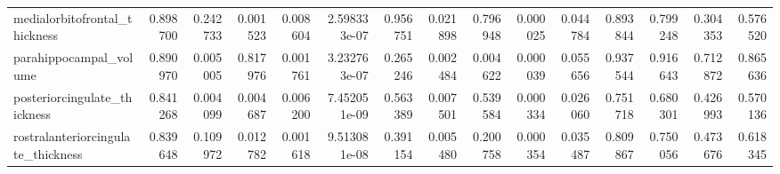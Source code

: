 \begin{tabular}{lrrrrrrrrrrrrrr}
medialorbitofrontal\_thickness      &  0.898700 &    0.242733 &     0.001523 &  0.008604 &  2.598333e-07 &      0.956751 &      0.021898 &  0.796948 &  0.000025 &  0.044784 &  0.893844 &  0.799248 &  0.304353 &  0.576520 \\
parahippocampal\_volume             &  0.890970 &    0.005005 &     0.817976 &  0.001761 &  3.232763e-07 &      0.265246 &      0.002484 &  0.004622 &  0.000039 &  0.055656 &  0.937544 &  0.916643 &  0.712872 &  0.865636 \\
posteriorcingulate\_thickness       &  0.841268 &    0.004099 &     0.004687 &  0.006200 &  7.452051e-09 &      0.563389 &      0.007501 &  0.539584 &  0.000334 &  0.026060 &  0.751718 &  0.680301 &  0.426993 &  0.570136 \\
rostralanteriorcingulate\_thickness &  0.839648 &    0.109972 &     0.012782 &  0.001618 &  9.513081e-08 &      0.391154 &      0.005480 &  0.200758 &  0.000354 &  0.035487 &  0.809867 &  0.750056 &  0.473676 &  0.618345 \\
\bottomrule
\end{tabular}